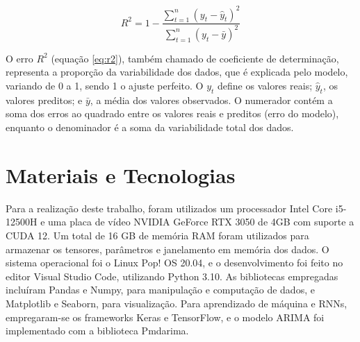 \begin{equation}
    R^2 = 1 - \frac{\sum_{t=1}^{n} (y_t - \hat{y}_t)^2}{\sum_{t=1}^{n}(y_t - \bar{y})^2}
    \label{eq:r2}
\end{equation}

O erro $R^2$ (equação \ref{eq:r2}), também chamado de coeficiente de determinação, representa a proporção da variabilidade dos dados, que é explicada pelo modelo, variando de 0 a 1, sendo 1 o ajuste perfeito.
O $y_t$ define os valores reais; $\hat{y}_t$, os valores preditos; e $\bar{y}$, a média dos valores observados. O numerador contém a soma dos erros ao quadrado entre os valores reais e preditos (erro do modelo), enquanto o denominador é a soma da variabilidade total dos dados.

\section{Materiais e Tecnologias} \label{sec:materiais}
Para a realização deste trabalho, 
foram utilizados um processador Intel Core i5-12500H e
uma placa de vídeo NVIDIA GeForce RTX 3050 de 4GB com suporte a CUDA 12.
Um total de 16 GB de memória RAM foram utilizados para armazenar os tensores, parâmetros e janelamento em memória dos dados. 
O sistema operacional foi o Linux Pop! OS 20.04, e o desenvolvimento foi feito no editor Visual Studio Code, utilizando Python 3.10. As bibliotecas empregadas incluíram Pandas e Numpy, para manipulação e computação de dados, e Matplotlib e Seaborn, para visualização. Para aprendizado de máquina e RNNs, empregaram-se os frameworks Keras e TensorFlow, e o modelo ARIMA foi implementado com a biblioteca Pmdarima.